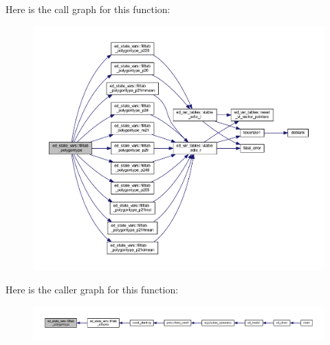 Here is the call graph for this function\+:\nopagebreak
\begin{figure}[H]
\begin{center}
\leavevmode
\includegraphics[width=350pt]{namespaceed__state__vars_a5059d40682c2653017de524077b8dae5_cgraph}
\end{center}
\end{figure}




Here is the caller graph for this function\+:\nopagebreak
\begin{figure}[H]
\begin{center}
\leavevmode
\includegraphics[width=350pt]{namespaceed__state__vars_a5059d40682c2653017de524077b8dae5_icgraph}
\end{center}
\end{figure}


